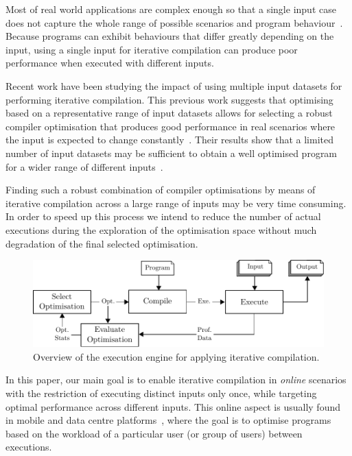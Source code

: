 \documentclass[sigplan,9pt]{acmart}
\newcommand{\itercomp}{{iterative compilation}}
\begin{document}
Most of real world applications are complex enough 
so that a single input case does not capture the whole
range of possible scenarios and program behaviour~\cite{haneda06,fursin07,chen10,chen12a}.
Because programs can exhibit behaviours that differ greatly depending on the input,
using a single input for {\itercomp} can produce poor performance when executed with different inputs.

Recent work have been studying
the impact of using multiple input datasets
for performing {\itercomp}.
This previous work suggests that optimising based on a representative range of input datasets
allows for selecting a robust compiler optimisation 
that produces good performance in real scenarios where
the input is expected to change constantly~\cite{haneda06,fursin07,chen10,chen12a,chen12b,fang15,mpeis16}.
Their results show that a limited number of input datasets may be sufficient to
obtain a well optimised program for a wider range of different inputs~\cite{haneda06,fursin07,chen10,chen12a}.

Finding such a robust combination of compiler optimisations by means of {\itercomp} across a large range of inputs
may be very time consuming.
In order to speed up this process we intend to reduce the number of actual executions during the exploration
of the optimisation space without much degradation of the final selected optimisation.

\begin{figure}[htb]
    \centering
    \includegraphics[width=\linewidth]{figs/diagram}
    \caption{Overview of the execution engine for applying {\itercomp}.}
    \label{fig:diagram}
\end{figure}

In this paper, our main goal is to enable {\itercomp} in
\textit{online} scenarios with the restriction of executing distinct inputs
only once, while targeting optimal performance across different inputs.
This online aspect is usually found in mobile and data centre
platforms~\cite{chen12b,fang15,mpeis16}, where the goal is to optimise
programs based on the workload of a particular user (or group of users)
between executions.
\end{document}
